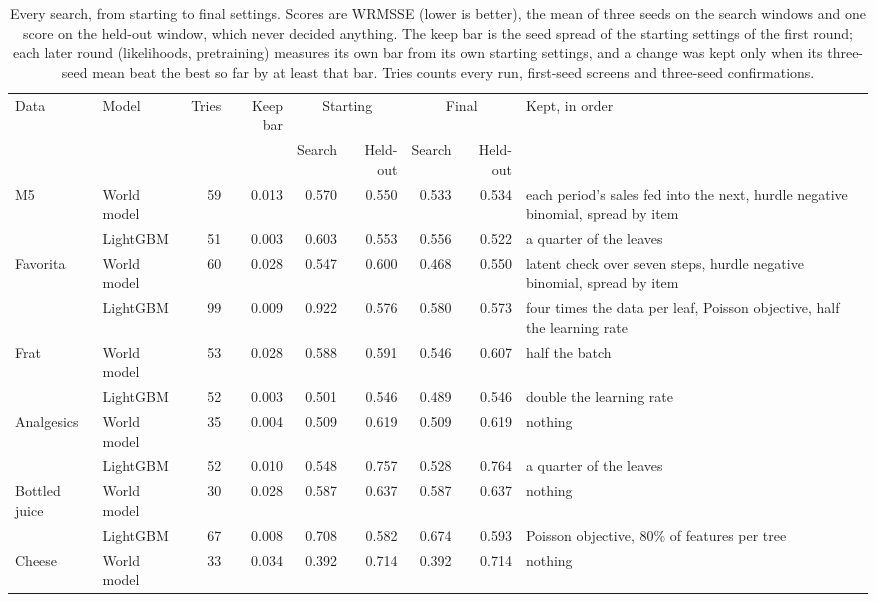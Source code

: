 \begin{table}[t]
\centering\footnotesize
\caption{Every search, from starting to final settings. Scores are WRMSSE (lower is better), the mean of three seeds on the search windows and one score on the held-out window, which never decided anything. The keep bar is the seed spread of the starting settings of the first round; each later round (likelihoods, pretraining) measures its own bar from its own starting settings, and a change was kept only when its three-seed mean beat the best so far by at least that bar. Tries counts every run, first-seed screens and three-seed confirmations.}
\label{tab:loop}
\begin{tabular}{llrrrrrrp{5.2cm}}
\toprule
Data & Model & Tries & Keep bar & \multicolumn{2}{c}{Starting} & \multicolumn{2}{c}{Final} & Kept, in order \\
& & & & Search & Held-out & Search & Held-out & \\
\midrule
M5 & World model & 59 & 0.013 & 0.570 & 0.550 & 0.533 & 0.534 & each period's sales fed into the next, hurdle negative binomial, spread by item \\
 & LightGBM & 51 & 0.003 & 0.603 & 0.553 & 0.556 & 0.522 & a quarter of the leaves \\
\addlinespace[2pt]
Favorita & World model & 60 & 0.028 & 0.547 & 0.600 & 0.468 & 0.550 & latent check over seven steps, hurdle negative binomial, spread by item \\
 & LightGBM & 99 & 0.009 & 0.922 & 0.576 & 0.580 & 0.573 & four times the data per leaf, Poisson objective, half the learning rate \\
\addlinespace[2pt]
Frat & World model & 53 & 0.028 & 0.588 & 0.591 & 0.546 & 0.607 & half the batch \\
 & LightGBM & 52 & 0.003 & 0.501 & 0.546 & 0.489 & 0.546 & double the learning rate \\
\addlinespace[2pt]
Analgesics & World model & 35 & 0.004 & 0.509 & 0.619 & 0.509 & 0.619 & nothing \\
 & LightGBM & 52 & 0.010 & 0.548 & 0.757 & 0.528 & 0.764 & a quarter of the leaves \\
\addlinespace[2pt]
Bottled juice & World model & 30 & 0.028 & 0.587 & 0.637 & 0.587 & 0.637 & nothing \\
 & LightGBM & 67 & 0.008 & 0.708 & 0.582 & 0.674 & 0.593 & Poisson objective, 80\% of features per tree \\
\addlinespace[2pt]
Cheese & World model & 33 & 0.034 & 0.392 & 0.714 & 0.392 & 0.714 & nothing \\

\end{tabular}
\end{table}
